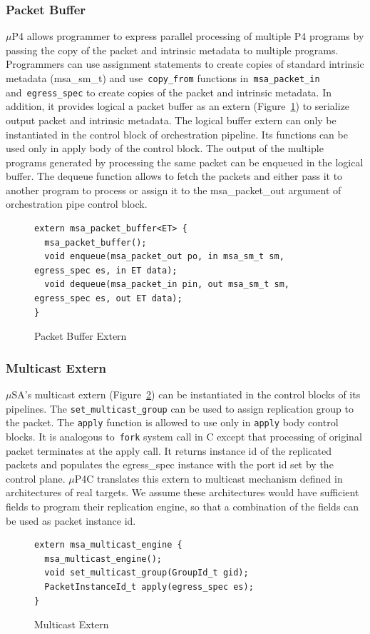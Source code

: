 \subsubsection{Packet Buffer}
$\mu$P4 allows programmer to express parallel processing of multiple P4 programs by passing the copy of the packet and intrinsic metadata to multiple programs.
Programmers can use assignment statements to create copies of standard intrinsic metadata (msa\_sm\_t) and use~\texttt{copy\_from} functions in~\texttt{msa\_packet\_in} and~\texttt{egress\_spec} to create copies of the packet and intrinsic metadata.
In addition, it provides logical a packet buffer as an extern (Figure~\ref{fig:msa-packet-buffer-extern}) to serialize output packet and intrinsic metadata.
The logical buffer extern can only be instantiated in the control block of orchestration pipeline.
Its functions can be used only in apply body of the control block.
The output of the multiple programs generated by processing the same packet can be enqueued in the logical buffer.
The dequeue function allows to fetch the packets and either pass it to another program to process or assign it to the msa\_packet\_out argument of orchestration pipe control block.
\begin{figure}[!h]
\begin{lstlisting}[frame=none]
extern msa_packet_buffer<ET> {
  msa_packet_buffer();
  void enqueue(msa_packet_out po, in msa_sm_t sm, egress_spec es, in ET data);
  void dequeue(msa_packet_in pin, out msa_sm_t sm, egress_spec es, out ET data); 
}
\end{lstlisting}
\caption{Packet Buffer Extern}
\label{fig:msa-packet-buffer-extern}
\end{figure}
\subsubsection{Multicast Extern}
$\mu$SA's multicast extern (Figure~\ref{fig:msa-multicast-extern}) can be instantiated in the control blocks of its pipelines.
The \texttt{set\_multicast\_group} can be used to assign replication group to the packet. 
The \texttt{apply} function is allowed to use only in \texttt{apply} body control blocks. 
It is analogous to~\texttt{fork} system call in C except that processing of original packet terminates at the apply call.
It returns instance id of the replicated packets and populates the egress\_spec instance with the port id set by the control plane.
$\mu$P4C translates this extern to multicast mechanism defined in architectures of real targets.
We assume these architectures would have sufficient fields to program their replication engine, so that a combination of the fields can be used as packet instance id.
\begin{figure}[!h]
\begin{lstlisting}[frame=none]
extern msa_multicast_engine {
  msa_multicast_engine();
  void set_multicast_group(GroupId_t gid);
  PacketInstanceId_t apply(egress_spec es);
}
\end{lstlisting}
\caption{Multicast Extern}
\label{fig:msa-multicast-extern}
\end{figure}
